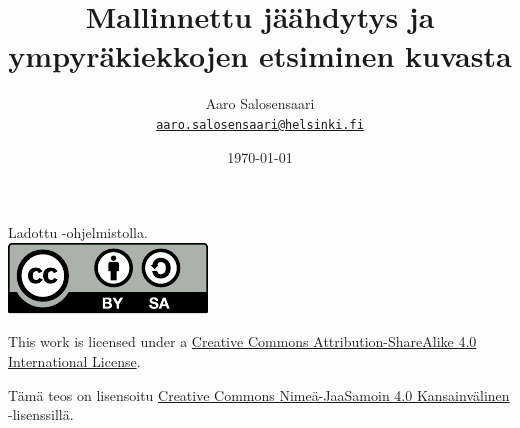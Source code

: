 \documentclass[11pt,a4paper,leqno]{report}
\newcommand{\Author}{Aaro Salosensaari}
\newcommand{\Title}{Mallinnettu jäähdytys ja ympyräkiekkojen etsiminen kuvasta}
\begin{document}
    \title{\Title}

    \author{\Author\\
        \small{ \texttt{\href{mailto:aaro.salosensaari@helsinki.fi}{aaro.salosensaari@helsinki.fi}}}
    }

    \date{\today}


    

    \newpage

    \thispagestyle{empty}
    \null
    \vfill
    \begin{center}
        Ladottu \LuaLaTeX-ohjelmistolla.\\\vspace{2em}
        \includegraphics[width=0.2\linewidth]{figures/by-sa.pdf}

        \noindent
        This work is licensed under a \href{http://creativecommons.org/licenses/by-sa/4.0/}{Creative Commons Attribution-ShareAlike 4.0 International License}.

        \noindent
        Tämä teos on lisensoitu \href{http://creativecommons.org/licenses/by-sa/4.0/}{Creative Commons Nimeä-JaaSamoin 4.0 Kansainvälinen} -lisenssillä.
    \end{center}

    \newpage
    
    \newpage
    \thispagestyle{empty}
    \null
    \newpage

    {\small
        \tableofcontents
        \setcounter{page}{1}
    }

    
    
    
    
    
    

    \printbibliography[heading=bibintoc]
\end{document}
